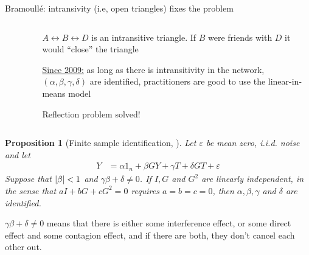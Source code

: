 \documentclass[aspectratio=169]{beamer}
\newtheorem{proposition}{Proposition}
\theoremstyle{remark}
\begin{document}
\begin{frame}{Bramoull\'e: intransivity (i.e, open triangles) fixes the problem}
    
    \begin{columns}
        \begin{column}{0.5\textwidth}
            \begin{figure}
                \centering
            \end{figure}
        \end{column}
        \begin{column}{0.5\textwidth}
            
            $A \leftrightarrow B \leftrightarrow D$ is an intransitive triangle. If $B$ were friends with $D$ it would ``close'' the triangle
            
            \vspace{4mm}
            
            \underline{Since 2009:} as long as there is intransitivity in the network, $(\alpha, \beta, \gamma, \delta)$ are identified, practitioners are good to use the linear-in-means model
            
            \vspace{4mm}
            
            Reflection problem solved!
        \end{column}
    \end{columns}
\end{frame}

\begin{frame}
    \begin{proposition}[Finite sample identification, \cite{bramoulle2009}]
        Let $\varepsilon$ be mean zero, i.i.d. noise and let
        \begin{align*}
            Y & = \alpha 1_n + \beta G Y + \gamma T + \delta G T + \varepsilon                        
        \end{align*}
        Suppose that $\lvert\beta\rvert < 1$ and $\gamma \beta + \delta \neq 0$. If $I, G$ and $G^2$ are linearly independent, in the sense that $a I + b G + c G^2 = 0$ requires $a = b = c = 0$, then $\alpha, \beta, \gamma$ and $\delta$ are identified.
    \end{proposition}
    
    $\gamma \beta + \delta \neq 0$ means that there is either some interference effect, or some direct effect and some contagion effect, and if there are both, they don't cancel each other out.
\end{frame}
\end{document}
